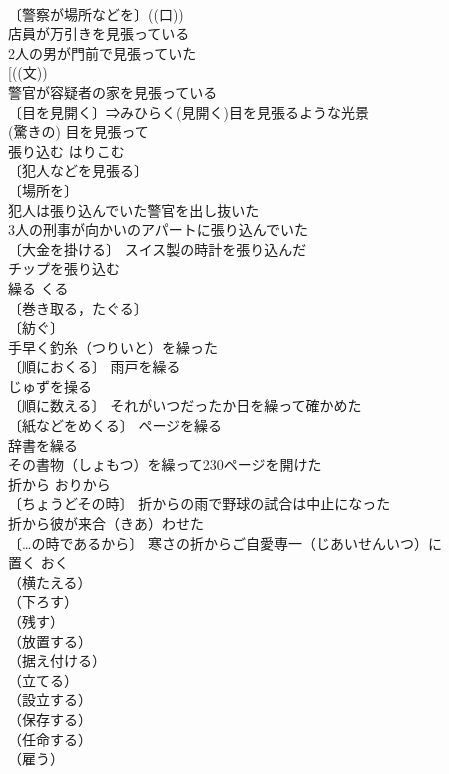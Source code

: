 \documentclass[8pt]{extreport}
\begin{document}
\begin{CJK}{UTF8}{min}
\\	〔警察が場所などを〕((口)) 
\\	店員が万引きを見張っている
\\	2人の男が門前で見張っていた
\\	[((文))
\\	警官が容疑者の家を見張っている
\\	〔目を見開く〕⇒みひらく(見開く)目を見張るような光景
\\	(驚きの) 目を見張って
\\	張り込む	はりこむ	
\\	〔犯人などを見張る〕
\\	〔場所を〕
\\	犯人は張り込んでいた警官を出し抜いた
\\	3人の刑事が向かいのアパートに張り込んでいた
\\	〔大金を掛ける〕 スイス製の時計を張り込んだ
\\	チップを張り込む
\\	繰る	くる	
\\	〔巻き取る，たぐる〕
\\	〔紡ぐ〕
\\	手早く釣糸（つりいと）を繰った 
\\	〔順におくる〕 雨戸を繰る 
\\	じゅずを操る 
\\	〔順に数える〕 それがいつだったか日を繰って確かめた 
\\	〔紙などをめくる〕 ページを繰る 
\\	辞書を繰る 
\\	その書物（しょもつ）を繰って230ページを開けた 
\\	折から	おりから	
\\	〔ちょうどその時〕 折からの雨で野球の試合は中止になった 
\\	折から彼が来合（きあ）わせた 
\\	〔…の時であるから〕 寒さの折からご自愛専一（じあいせんいつ）に 
\\	置く	おく	
\\	（横たえる）
\\	（下ろす）
\\	（残す）
\\	（放置する）
\\	（据え付ける）
\\	（立てる）
\\	（設立する）
\\	（保存する）
\\	（任命する）
\\	（雇う）

\end{CJK}
\end{document}
